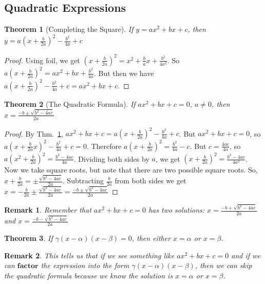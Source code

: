 \documentclass[oneside]{book}
\theoremstyle{mystyle}
\newtheorem{theorem}{Theorem}[section]
\newtheorem{remark}{Remark}[section]
\begin{document}
\subsection{Quadratic Expressions}
\begin{theorem}[Completing the Square]
\label{theorem:north_shore_completing_the_square}
If $y = ax^2 +bx +c$, then $y = a(x+\frac{b}{2a})^2 - \frac{b^2}{4a}+c$
\end{theorem}
\begin{proof}
Using \gls{foil}, we get $(x+\frac{b}{2a})^2 = x^2 + \frac{b}{a}x + \frac{b^2}{4a^2}$. So $a(x+\frac{b}{2a})^2 = ax^2 + bx + \frac{b^2}{4a}$. But then we have $a(x+\frac{b}{2a})^2 - \frac{b^2}{4a} + c = ax^2 + bx +c$.
\end{proof}
\begin{theorem}[The Quadratic Formula]
\label{theorem:north_shore_quadratic_formula_theorem}
If $ax^2 + bx + c = 0$, $a\ne 0$, then $x = \frac{-b\pm \sqrt{b^2 - 4ac}}{2a}$
\end{theorem}
\begin{proof}
By Thm.~\ref{theorem:north_shore_completing_the_square}, $ax^2 + bx + c = a(x+\frac{b}{2a})^2 - \frac{b^2}{4a} + c$. But $ax^2 + bx + c = 0$, so $a(x+\frac{b}{2a}x)^2 - \frac{b^2}{4a} + c = 0$. Therefore $a(x+\frac{b}{2a})^2 = \frac{b^2}{4a} - c$. But $c = \frac{4ac}{4a}$, so $a(x^2+\frac{b}{2a})^2 = \frac{b^2-4ac}{4a}$. Dividing both sides by $a$, we get $(x+\frac{b}{2a})^2 = \frac{b^2-4ac}{4a^2}$. Now we take square roots, but note that there are two possible square roots. So, $x+\frac{b}{2a} = \pm \frac{\sqrt{b^2 - 4ac}}{2a}$. Subtracting $\frac{b}{2a}$ from both sides we get $x = -\frac{b}{2a} \pm \frac{\sqrt{b^2-4ac}}{2a} = \frac{-b \pm \sqrt{b^2 - 4ac}}{2a}$
\end{proof}
\begin{remark}
Remember that $ax^2 +bx +c = 0$ has two solutions: $x = \frac{-b + \sqrt{b^2 - 4ac}}{2a}$ and $x = \frac{-b - \sqrt{b^2-4ac}}{2a}$
\end{remark}
\begin{theorem}
\label{theorem:north_shore_zeros_of_a_factored_polynomial}
If $\gamma(x-\alpha)(x-\beta) = 0$, then either $x=\alpha$ or $x=\beta$.
\end{theorem}
\begin{remark}
This tells us that if we see something like $ax^2+bx+c = 0$ and if we can $\mathbf{factor}$ the expression into the form $\gamma(x-\alpha)(x-\beta)$, then we can skip the quadratic formula because we know the solution is $x = \alpha$ or $x=\beta$.
\end{remark}
\end{document}
